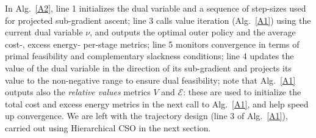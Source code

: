 \documentclass[10pt, twocolumn]{IEEEtran}
\theoremstyle{plain}
\theoremstyle{definition}
\theoremstyle{remark}
\begin{document}
In Alg.~\ref{A2}, line 1 initializes the dual variable and a sequence of step-sizes used for projected sub-gradient ascent; line 3 calls value iteration (Alg.~\ref{A1}) using the current dual variable $\nu$, and outputs the optimal outer policy and the average cost-, excess energy- per-stage metrics; line 5 monitors convergence in terms of  primal feasibility and complementary slackness conditions; line 4 updates the value of the dual variable in the direction of its sub-gradient and projects its value to the non-negative range to ensure dual feasibility;
note that Alg.~\ref{A1}  outputs also the \emph{relative values} metrics $V$ and $\mathcal E$:
these are used to initialize the total cost and excess energy metrics in the next call to Alg.~\ref{A1}, and help speed up convergence. We are left with the trajectory design (line $3$ of Alg.~\ref{A1}), carried out using Hierarchical CSO in the next section.
\end{document}
